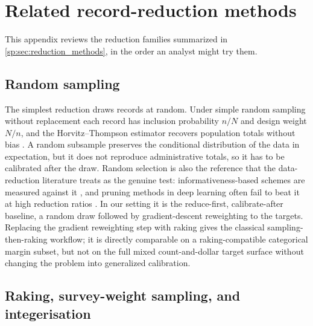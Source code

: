 \section{Related record-reduction methods}
\label{sp:app:reduction}

This appendix reviews the reduction families summarized in \autoref{sp:sec:reduction_methods},
in the order an analyst might try them.

\subsection{Random sampling}

The simplest reduction draws records at random. Under simple random sampling without replacement each
record has inclusion probability $n/N$ and design weight $N/n$, and the Horvitz--Thompson estimator
recovers population totals without bias \citep{horvitz1952, cochran1977, sarndal1992}. A random
subsample preserves the conditional distribution of the data in expectation, but it does not
reproduce administrative totals, so it has to be calibrated after the draw. Random selection is also
the reference that the data-reduction literature treats as the genuine test: informativeness-based
schemes are measured against it \citep{ma2015leveraging}, and pruning methods in deep learning often
fail to beat it at high reduction ratios \citep{guo2022deepcore}. In our setting it is the
reduce-first, calibrate-after baseline, a random draw followed by gradient-descent reweighting to the
targets. Replacing the gradient reweighting step with raking gives the classical sampling-then-raking
workflow; it is directly comparable on a raking-compatible categorical margin subset, but not on the
full mixed count-and-dollar target surface without changing the problem into generalized calibration.

\subsection{Raking, survey-weight sampling, and integerisation}

